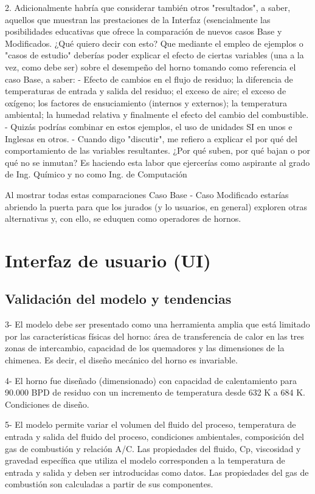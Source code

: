 2.    Adicionalmente habría que considerar también otros "resultados", a saber, aquellos que muestran las prestaciones de la Interfaz (esencialmente las posibilidades educativas que ofrece la comparación de nuevos casos Base y Modificados. 
¿Qué quiero decir con esto?
Que mediante el empleo de ejemplos o "casos de estudio" deberías poder explicar el efecto de ciertas variables (una a la vez, como debe ser) sobre el desempeño del horno tomando como referencia el caso Base, a saber:
-    Efecto de cambios en el flujo de residuo; la diferencia de temperaturas de entrada y salida del residuo; el exceso de aire; el exceso de oxígeno; los factores de ensuciamiento (internos y externos); la temperatura ambiental; la humedad relativa y finalmente el efecto del cambio del combustible. 
-    Quizás podrías combinar en estos ejemplos, el uso de unidades SI en unos e Inglesas en otros. 
-    Cuando digo "discutir", me refiero a explicar el por qué del comportamiento de las variables resultantes. ¿Por qué suben, por qué bajan o por qué no se inmutan? 
Es haciendo esta labor que ejercerías como aspirante al grado de Ing. Químico y no como Ing. de Computación

Al mostrar todas estas comparaciones Caso Base - Caso Modificado estarías abriendo la puerta para que los jurados (y lo usuarios, en general) exploren otras alternativas y, con ello, se eduquen como operadores de hornos.

\section{Interfaz de usuario (UI)}

\subsection{Validación del modelo y tendencias}

3-      El modelo debe ser presentado como una herramienta amplia que está limitado por las características físicas del horno: área de transferencia de calor en las tres zonas de intercambio, capacidad de los quemadores y las dimensiones de la chimenea. Es decir, el diseño mecánico del horno es invariable.

4-      El horno   fue diseñado (dimensionado)  con capacidad de calentamiento para 90.000 BPD de residuo  con un incremento de temperatura desde  632 K a 684 K. Condiciones de diseño.

5-      El modelo permite variar el volumen del fluido del proceso, temperatura de entrada y salida del fluido del proceso, condiciones ambientales, composición del gas de combustión y relación A/C. Las propiedades del fluido, Cp, viscosidad y gravedad específica que utiliza el modelo corresponden a la temperatura de entrada y salida y deben ser introducidas como datos. Las propiedades del gas de combustión son calculadas a partir de sus componentes.

